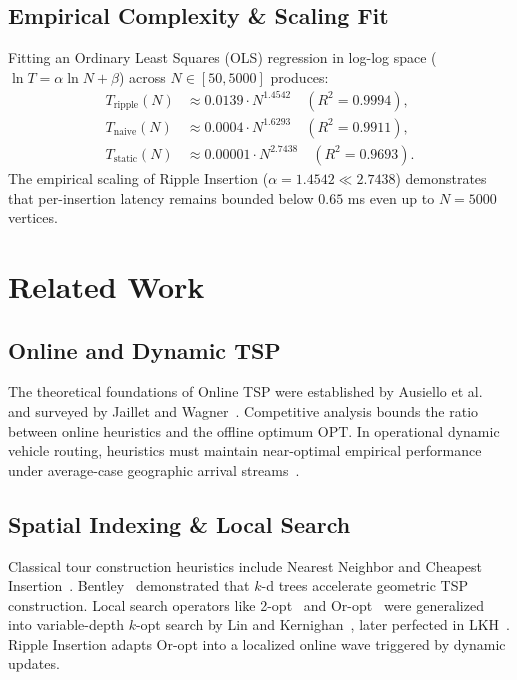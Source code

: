 \documentclass{article}
\theoremstyle{definition}
\begin{document}
\subsection{Empirical Complexity \& Scaling Fit}

Fitting an Ordinary Least Squares (OLS) regression in log-log space ($\ln T = \alpha \ln N + \beta$) across $N \in [50, 5000]$ produces:
\begin{align}
T_{\text{ripple}}(N) &\approx 0.0139 \cdot N^{\mathbf{1.4542}} \quad (R^2 = 0.9994), \\
T_{\text{naive}}(N)  &\approx 0.0004 \cdot N^{1.6293} \quad (R^2 = 0.9911), \\
T_{\text{static}}(N) &\approx 0.00001 \cdot N^{\mathbf{2.7438}} \quad (R^2 = 0.9693).
\end{align}
The empirical scaling of Ripple Insertion ($\alpha = 1.4542 \ll 2.7438$) demonstrates that per-insertion latency remains bounded below $0.65$ ms even up to $N = 5000$ vertices.

\section{Related Work}

\subsection{Online and Dynamic TSP}
The theoretical foundations of Online TSP were established by Ausiello et al.~\cite{ausiello2001online} and surveyed by Jaillet and Wagner~\cite{jaillet2008online}. Competitive analysis bounds the ratio between online heuristics and the offline optimum $\text{OPT}$. In operational dynamic vehicle routing, heuristics must maintain near-optimal empirical performance under average-case geographic arrival streams~\cite{psaraftis1988dynamic}.

\subsection{Spatial Indexing \& Local Search}
Classical tour construction heuristics include Nearest Neighbor and Cheapest Insertion~\cite{rosenkrantz1977analysis}. Bentley~\cite{bentley1992fast} demonstrated that $k$-d trees accelerate geometric TSP construction. Local search operators like 2-opt~\cite{croes1958method} and Or-opt~\cite{or1976traveling} were generalized into variable-depth $k$-opt search by Lin and Kernighan~\cite{lin1973effective}, later perfected in LKH~\cite{helsgaun2000effective, helsgaun2017extension}. Ripple Insertion adapts Or-opt into a localized online wave triggered by dynamic updates.
\end{document}
